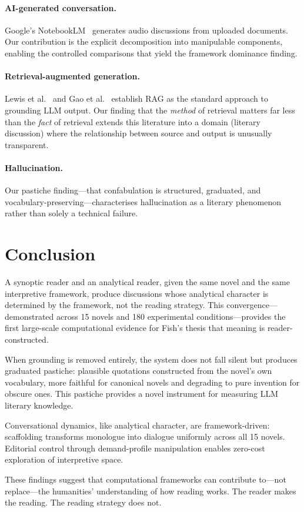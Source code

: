 \documentclass[final]{clv2025}
\begin{document}
\paragraph{AI-generated conversation.}
Google's NotebookLM~\cite{notebooklm2024} generates audio discussions
from uploaded documents.  Our contribution is the explicit
decomposition into manipulable components, enabling the controlled
comparisons that yield the framework dominance finding.

\paragraph{Retrieval-augmented generation.}
Lewis et al.~\cite{lewis2020rag} and Gao et al.~\cite{gao2024rag}
establish RAG as the standard approach to grounding LLM output.  Our
finding that the \emph{method} of retrieval matters far less than the
\emph{fact} of retrieval extends this literature into a domain
(literary discussion) where the relationship between source and output
is unusually transparent.

\paragraph{Hallucination.}
Our pastiche finding---that confabulation is structured, graduated, and
vocabulary-preserving---characterises hallucination as a literary
phenomenon rather than solely a technical failure.


\section{Conclusion}
\label{sec:conclusion}

A synoptic reader and an analytical reader, given the same novel and
the same interpretive framework, produce discussions whose analytical
character is determined by the framework, not the reading strategy.
This convergence---demonstrated across 15 novels and 180 experimental
conditions---provides the first large-scale computational evidence for
Fish's thesis that meaning is reader-constructed.

When grounding is removed entirely, the system does not fall silent but
produces graduated pastiche: plausible quotations constructed from
the novel's own vocabulary, more faithful for canonical novels and
degrading to pure invention for obscure ones.  This pastiche provides
a novel instrument for measuring LLM literary knowledge.

Conversational dynamics, like analytical character, are
framework-driven: scaffolding transforms monologue into dialogue
uniformly across all 15 novels.  Editorial control through
demand-profile manipulation enables zero-cost exploration of
interpretive space.

These findings suggest that computational frameworks can contribute
to---not replace---the humanities' understanding of how reading
works.  The reader makes the reading.  The reading strategy does not.




\end{document}
